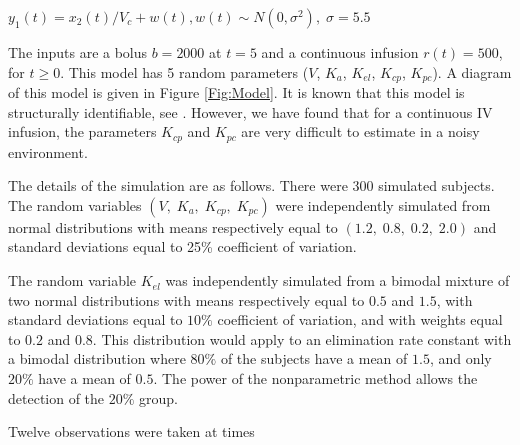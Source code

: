 $y_1(t) = x_2(t)/V_c + w(t),  w(t) \sim  N(0, \sigma^2), \;  \sigma = 5.5 \; $

%

\noindent The inputs are a bolus $b = 2000$ at $t = 5$  and a continuous infusion  $r(t) = 500$, for  $t \geq  0$.
%
This model has 5 random parameters ($V$, $K_a$, $K_{el}$, $K_{cp}$,  $K_{pc}$).
%
A diagram of this model is given in Figure \ref{Fig:Model}.
%
It is known that this model is structurally identifiable, see \citet{Godfrey86}.
However, we have found that for a continuous IV infusion, the parameters  $K_{cp}$ and $K_{pc}$ are very difficult to estimate in a noisy environment.

%


The details of the simulation are as follows.
%
There were $300$ simulated subjects.
%
The random variables $(V, \; K_{a}, \; K_{cp},  \; K_{pc})$ were independently simulated from  normal distributions with means  respectively equal to $(1.2, \; 0.8, \;  0.2, \; 2.0)$ and standard deviations equal to 25\% coefficient of variation.

The random variable  $K_{el}$  was independently simulated from a bimodal mixture of two normal distributions with means  respectively equal to $0.5$ and $1.5$, with standard deviations equal to $10\%$ coefficient of variation, and with weights equal to $0.2$ and $0.8$.
%
This distribution would apply to an elimination rate constant with a bimodal distribution where $80\%$ of the subjects have a mean of $1.5$,   and only $20\%$  have a mean of $0.5$.
%
The power of the nonparametric method allows the detection of the $20\%$ group.
%





% 
Twelve observations were taken at times  

